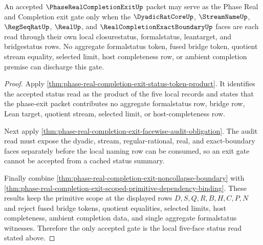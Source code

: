 \begin{theorem}
\label{thm:phase-real-completion-exit-local-status-gate}
An accepted $\PhaseRealCompletionExitUp$ packet may serve as the Phase Real and Completion exit gate only when the $\DyadicRatCoreUp$, $\StreamNameUp$, $\RegSeqRatUp$, $\RealUp$, and $\RealCompletionExactBoundaryUp$ faces are each read through their own local closurestatus, formalstatus, leantarget, and bridgestatus rows. No aggregate formalstatus token, fused bridge token, quotient stream equality, selected limit, host completeness row, or ambient completion premise can discharge this gate.
\end{theorem}
\begin{proof}
Apply \autoref{thm:phase-real-completion-exit-status-token-product}. It identifies the accepted status read as the product of the five local records and states that the phase-exit packet contributes no aggregate formalstatus row, bridge row, Lean target, quotient stream, selected limit, or host-completeness row.

Next apply \autoref{thm:phase-real-completion-exit-facewise-audit-obligation}. The audit read must expose the dyadic, stream, regular-rational, real, and exact-boundary faces separately before the local naming row can be consumed, so an exit gate cannot be accepted from a cached status summary.

Finally combine \autoref{thm:phase-real-completion-exit-noncollapse-boundary} with \autoref{thm:phase-real-completion-exit-scoped-primitive-dependency-binding}. These results keep the primitive scope at the displayed rows $D,S,Q,R,B,H,C,P,N$ and reject fused bridge tokens, quotient equalities, selected limits, host completeness, ambient completion data, and single aggregate formalstatus witnesses. Therefore the only accepted gate is the local five-face status read stated above.
\end{proof}

